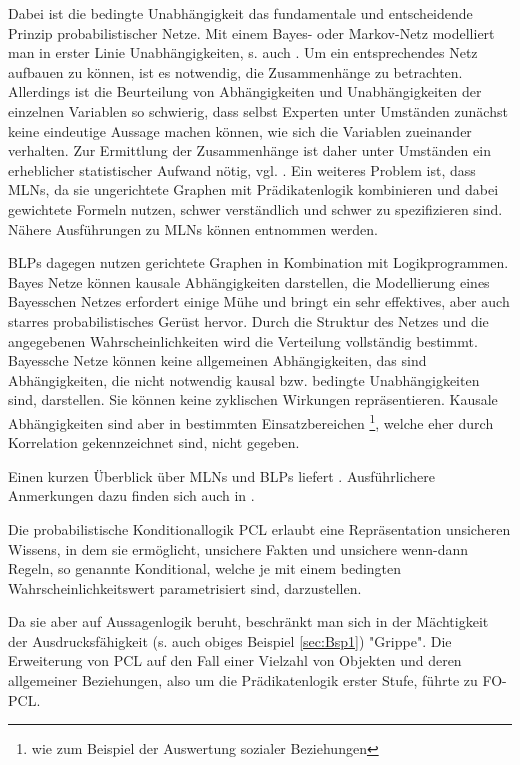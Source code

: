 \documentclass[a4paper, 11pt]{book}
\begin{document}
Dabei ist die bedingte Unabhängigkeit das fundamentale und entscheidende Prinzip probabilistischer Netze. Mit einem Bayes- oder Markov-Netz modelliert man in erster Linie Unabhängigkeiten, s. auch \cite[Kap. 12.1 und 12.2]{BKI08}. Um ein entsprechendes Netz aufbauen zu können, ist es notwendig, die Zusammenhänge zu betrachten. Allerdings ist die Beurteilung von Abhängigkeiten und Unabhängigkeiten der einzelnen Variablen so schwierig, dass selbst Experten unter Umständen zunächst keine eindeutige Aussage machen können, wie sich die Variablen zueinander verhalten. Zur Ermittlung der Zusammenhänge ist daher unter Umständen ein erheblicher statistischer Aufwand nötig, vgl. \cite[12.6, S. 402 /403]{BKI08}.
 Ein weiteres Problem ist, dass MLNs, da sie ungerichtete Graphen mit Prädikatenlogik kombinieren und dabei gewichtete Formeln nutzen, schwer verständlich und schwer zu spezifizieren sind. Nähere Ausführungen zu MLNs können \cite{DR06} entnommen werden. 
 
 BLPs dagegen nutzen gerichtete Graphen in Kombination mit Logikprogrammen. Bayes Netze können kausale Abhängigkeiten darstellen, die Modellierung eines Bayesschen Netzes erfordert einige Mühe und bringt ein sehr effektives, aber auch starres probabilistisches Gerüst hervor. Durch die Struktur des Netzes und die angegebenen Wahrscheinlichkeiten wird die Verteilung vollständig bestimmt. Bayessche Netze können keine allgemeinen Abhängigkeiten, das sind Abhängigkeiten, die nicht notwendig kausal bzw. bedingte Unabhängigkeiten sind, darstellen. Sie können keine zyklischen Wirkungen repräsentieren. Kausale Abhängigkeiten sind aber in bestimmten Einsatzbereichen \footnote {wie zum Beispiel der Auswertung sozialer Beziehungen}, welche eher durch Korrelation gekennzeichnet sind, nicht gegeben.
 
Einen kurzen Überblick über MLNs und BLPs liefert \cite[Kap. 2.1 und 2.2]{FLT09}.
Ausführlichere Anmerkungen dazu finden sich auch in \cite[Kap. 2]{KIBFT11}.

Die probabilistische Konditionallogik PCL   erlaubt eine Repräsentation unsicheren Wissens, in dem sie ermöglicht,  unsichere Fakten und unsichere wenn-dann Regeln, so genannte Konditional, welche je mit einem bedingten Wahrscheinlichkeitswert parametrisiert sind, darzustellen. 

Da sie aber auf Aussagenlogik beruht, beschränkt man sich in der Mächtigkeit der Ausdrucksfähigkeit (s. auch obiges Beispiel \ref{sec:Bsp1}) "{}Grippe"{}. Die Erweiterung von PCL auf den Fall einer Vielzahl von Objekten und deren allgemeiner Beziehungen, also um die Prädikatenlogik erster Stufe, führte zu FO-PCL.
\end{document}
